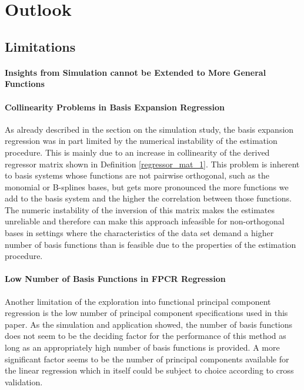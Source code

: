 \documentclass[11pt,twoside,a4paper]{article}
\begin{document}

	\section{Outlook}\label{Outlook}
	
	\subsection{Limitations}
	
	\paragraph{Insights from Simulation cannot be Extended to More General Functions}
	\vspace{-0.2cm}
	
	\paragraph{Collinearity Problems in Basis Expansion Regression}
	As already described in the section on the simulation study, the basis expansion regression was in part limited by the numerical instability of the estimation procedure. This is mainly due to an increase in collinearity of the derived regressor matrix shown in Definition \ref{regressor_mat_1}. This problem is inherent to basis systems whose functions are not pairwise orthogonal, such as the monomial or B-splines bases, but gets more pronounced the more functions we add to the basis system and the higher the correlation between those functions. \\
	The numeric instability of the inversion of this matrix makes the estimates unreliable and therefore can make this approach infeasible for non-orthogonal bases in settings where the characteristics of the data set demand a higher number of basis functions than is feasible due to the properties of the estimation procedure.
	\vspace{-0.2cm}
	
	\paragraph{Low Number of Basis Functions in FPCR Regression}
	Another limitation of the exploration into functional principal component regression is the low number of principal component specifications used in this paper. As the simulation and application showed, the number of basis functions does not seem to be the deciding factor for the performance of this method as long as an appropriately high number of basis functions is provided. 
	A more significant factor seems to be the number of principal components available for the linear regression which in itself could be subject to choice according to cross validation.
	\vspace{-0.2cm}
	
\end{document}
